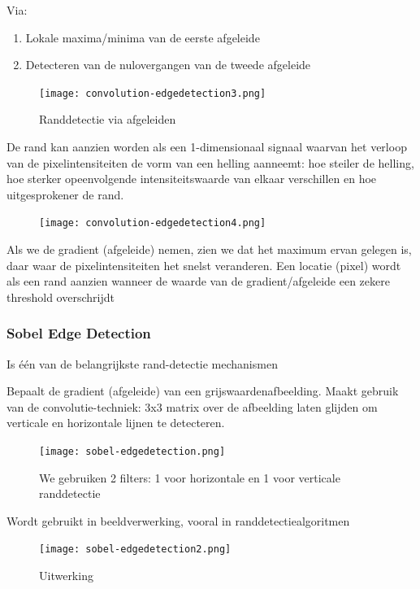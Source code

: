 \documentclass{article}
\begin{document}
Via:

\begin{enumerate}
    \item Lokale maxima/minima van de eerste afgeleide
    \item Detecteren van de nulovergangen van de tweede afgeleide
\end{enumerate}

\begin{figure}[H]
    \centering
    \texttt{[image: convolution-edgedetection3.png]}
    \caption{Randdetectie via afgeleiden}
\end{figure}

De rand kan aanzien worden als een 1-dimensionaal signaal waarvan het
verloop van de pixelintensiteiten de vorm van een helling aanneemt:
hoe steiler de helling, hoe sterker opeenvolgende intensiteitswaarde
van elkaar verschillen en hoe uitgesprokener de rand.

\begin{figure}[H]
    \centering
    \texttt{[image: convolution-edgedetection4.png]}
\end{figure}

Als we de gradient (afgeleide) nemen, zien we dat het maximum ervan
gelegen is, daar waar de pixelintensiteiten het snelst veranderen. Een
locatie (pixel) wordt als een rand aanzien wanneer de waarde van de
gradient/afgeleide een zekere threshold overschrijdt

\subsubsection{Sobel Edge Detection}

Is één van de belangrijkste rand-detectie mechanismen

Bepaalt de gradient (afgeleide) van een grijswaardenafbeelding.
Maakt gebruik van de convolutie-techniek: 3x3 matrix over de afbeelding
laten glijden om verticale en horizontale lijnen te detecteren.

\begin{figure}[H]
    \centering
    \texttt{[image: sobel-edgedetection.png]}
    \caption{We gebruiken 2 filters: 1 voor horizontale en 1 voor verticale randdetectie}
\end{figure}

Wordt gebruikt in beeldverwerking, vooral in randdetectiealgoritmen

\begin{figure}[H]
    \centering
    \texttt{[image: sobel-edgedetection2.png]}
    \caption{Uitwerking}
\end{figure}
\end{document}
